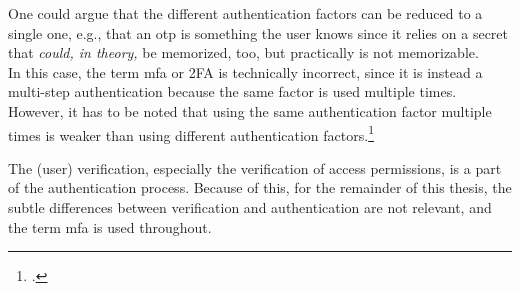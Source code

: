 One could argue that the different authentication factors can be reduced to a single one, e.g., that an \gls{otp} is \frqq something the user knows\flqq{} since it relies on a secret that \textit{could, in theory,} be memorized, too, but practically is not memorizable.\\
In this case, the term \gls{mfa} or 2FA is technically incorrect, since it is instead a multi-step authentication because the same factor is used multiple times. However, it has to be noted that using the same authentication factor multiple times is weaker than using different authentication factors.\footcite[See][117]{grimes2017hacking}

The (user) verification, especially the verification of access permissions, is a part of the authentication process. Because of this, for the remainder of this thesis, the subtle differences between verification and authentication are not relevant, and the term \gls{mfa} is used throughout.
